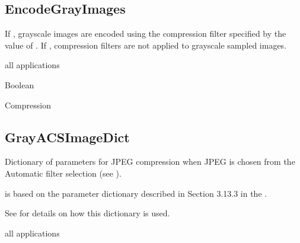 \documentclass[letterpaper,12pt,english,openany,oneside]{sphinxmanual}
\begin{document}
\begin{sphinxVerbatim}[commandchars=\\\{\}]
\end{sphinxVerbatim}




\subsection{EncodeGrayImages}
\label{\detokenize{PDF_Create_CommonSettings:encodegrayimages}}
If  , grayscale images are encoded using the compression filter specified by the value of  . If  , compression filters are not applied to grayscale sampled images.

\label{\detokenize{PDF_Create_CommonSettings:supported-by-40}}

all applications

\label{\detokenize{PDF_Create_CommonSettings:type-40}}

Boolean

\label{\detokenize{PDF_Create_CommonSettings:ui-name-29}}

Compression




\subsection{GrayACSImageDict}
\label{\detokenize{PDF_Create_CommonSettings:grayacsimagedict}}
Dictionary of parameters for JPEG compression when JPEG is chosen from the Automatic filter selection (see ).

 is based on the  parameter dictionary described in Section 3.13.3 in the  .

See  for details on how this dictionary is used.

\label{\detokenize{PDF_Create_CommonSettings:supported-by-41}}

all applications
\end{document}
